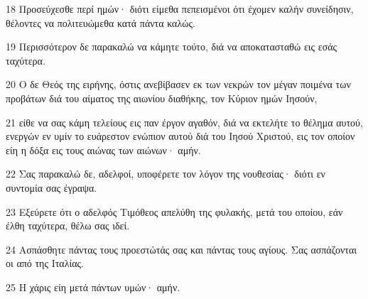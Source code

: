 \par 18 Προσεύχεσθε περί ημών· διότι είμεθα πεπεισμένοι ότι έχομεν καλήν συνείδησιν, θέλοντες να πολιτευώμεθα κατά πάντα καλώς.
\par 19 Περισσότερον δε παρακαλώ να κάμητε τούτο, διά να αποκατασταθώ εις εσάς ταχύτερα.
\par 20 Ο δε Θεός της ειρήνης, όστις ανεβίβασεν εκ των νεκρών τον μέγαν ποιμένα των προβάτων διά του αίματος της αιωνίου διαθήκης, τον Κύριον ημών Ιησούν,
\par 21 είθε να σας κάμη τελείους εις παν έργον αγαθόν, διά να εκτελήτε το θέλημα αυτού, ενεργών εν υμίν το ευάρεστον ενώπιον αυτού διά του Ιησού Χριστού, εις τον οποίον είη η δόξα εις τους αιώνας των αιώνων· αμήν.
\par 22 Σας παρακαλώ δε, αδελφοί, υποφέρετε τον λόγον της νουθεσίας· διότι εν συντομία σας έγραψα.
\par 23 Εξεύρετε ότι ο αδελφός Τιμόθεος απελύθη της φυλακής, μετά του οποίου, εάν έλθη ταχύτερα, θέλω σας ιδεί.
\par 24 Ασπάσθητε πάντας τους προεστώτάς σας και πάντας τους αγίους. Σας ασπάζονται οι από της Ιταλίας.
\par 25 Η χάρις είη μετά πάντων υμών· αμήν.


